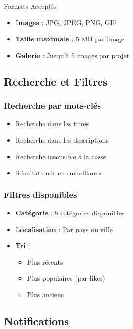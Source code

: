 \documentclass[12pt,a4paper]{article}
\begin{document}
\begin{infobox}{Formats Acceptés}
\begin{itemize}[leftmargin=*]
    \item \textbf{Images} : JPG, JPEG, PNG, GIF
    \item \textbf{Taille maximale} : 5 MB par image
    \item \textbf{Galerie} : Jusqu'à 5 images par projet
\end{itemize}
\end{infobox}

\subsection{Recherche et Filtres}

\subsubsection{Recherche par mots-clés}
\begin{itemize}[leftmargin=*]
    \item Recherche dans les titres
    \item Recherche dans les descriptions
    \item Recherche insensible à la casse
    \item Résultats mis en surbrillance
\end{itemize}

\subsubsection{Filtres disponibles}
\begin{itemize}[leftmargin=*]
    \item \textbf{Catégorie} : 8 catégories disponibles
    \item \textbf{Localisation} : Par pays ou ville
    \item \textbf{Tri} :
    \begin{itemize}
        \item Plus récents
        \item Plus populaires (par likes)
        \item Plus anciens
    \end{itemize}
\end{itemize}

\subsection{Notifications}
\end{document}
